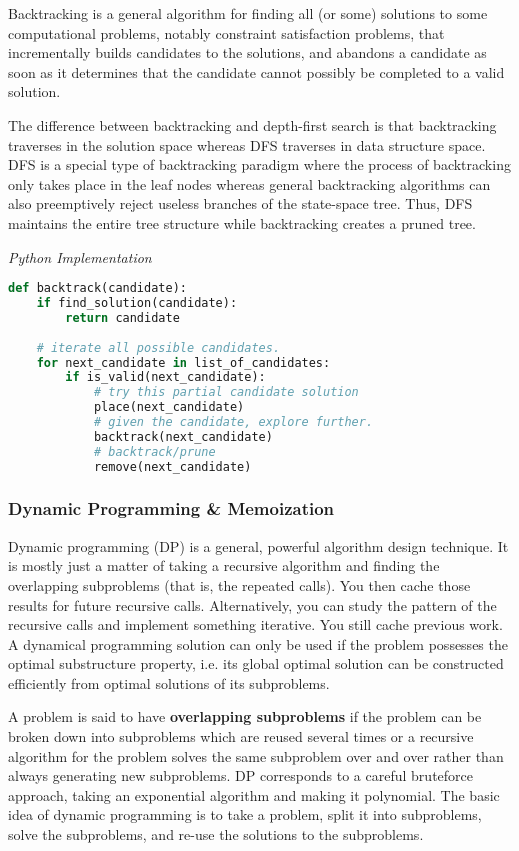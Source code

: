 \documentclass{article}
\begin{document}
    Backtracking is a general algorithm for finding all (or some) solutions to some computational problems, notably constraint satisfaction problems, that incrementally builds candidates to the solutions, and abandons a candidate as soon as it determines that the candidate cannot possibly be completed to a valid solution.

    The difference between backtracking and depth-first search is that backtracking traverses in the solution space whereas DFS traverses in data structure space. DFS is a special type of backtracking paradigm where the process of backtracking only takes place in the leaf nodes whereas general backtracking algorithms can also preemptively reject useless branches of the state-space tree. Thus, DFS maintains the entire tree structure while backtracking creates a pruned tree.
    
\vspace{8pt} \emph{Python Implementation}
\begin{lstlisting}[language=Python]
def backtrack(candidate):
    if find_solution(candidate):
        return candidate
    
    # iterate all possible candidates.
    for next_candidate in list_of_candidates:
        if is_valid(next_candidate):
            # try this partial candidate solution
            place(next_candidate)
            # given the candidate, explore further.
            backtrack(next_candidate)
            # backtrack/prune
            remove(next_candidate)
\end{lstlisting}
    
    \subsubsection{Dynamic Programming \& Memoization}
    Dynamic programming (DP) is a general, powerful algorithm design technique. It is mostly just a matter of taking a recursive algorithm and finding the overlapping subproblems (that is, the repeated calls). You then cache those results for future recursive calls. Alternatively, you can study the pattern of the recursive calls and implement something iterative. You still cache previous work. A dynamical programming solution can only be used if the problem possesses the optimal substructure property, i.e. its global optimal solution can be constructed efficiently from optimal solutions of its subproblems. 
    
    A problem is said to have \textbf{overlapping subproblems} if the problem can be broken down into subproblems which are reused several times or a recursive algorithm for the problem solves the same subproblem over and over rather than always generating new subproblems. DP corresponds to a careful bruteforce approach, taking an exponential algorithm and making it polynomial. The basic idea of dynamic programming is to take a problem, split it into subproblems, solve the subproblems, and re-use the solutions to the subproblems.
\end{document}
